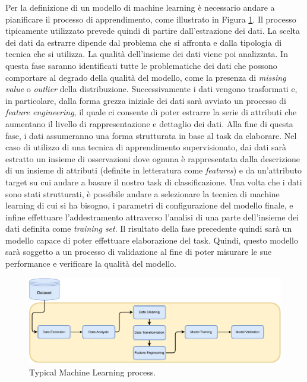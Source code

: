 Per la definizione di un modello di machine learning è necessario andare a pianificare il processo di apprendimento, come illustrato in Figura \ref{fig:ml_process}.
Il processo tipicamente utilizzato prevede quindi di partire dall'estrazione dei dati. La scelta dei dati da estrarre dipende dal problema che si affronta e dalla tipologia di tecnica che si utilizza. 
La qualità dell'insieme dei dati viene poi analizzata. In questa fase saranno identificati tutte le problematiche dei dati che possono comportare al degrado della qualità del modello, come la presenza di \textit{missing value} o \textit{outlier} della distribuzione.
Successivamente i dati vengono trasformati e, in particolare, dalla forma grezza iniziale dei dati sarà avviato un processo di \textit{feature engineering}, il quale ci consente di poter estrarre la serie di attributi che aumentano il livello di rappresentazione e dettaglio dei dati.
Alla fine di questa fase, i dati assumeranno una forma strutturata in base al task da elaborare. Nel caso di utilizzo di una tecnica di apprendimento supervisionato, dai dati sarà estratto un insieme di osservazioni dove ognuna è rappresentata dalla descrizione di un insieme di attributi (definite in letteratura come \textit{features}) e da un'attributo target su cui andare a basare il nostro task di classificazione.
Una volta che i dati sono stati strutturati, è possibile andare a selezionare la tecnica di machine learning di cui si ha bisogno, i parametri di configurazione del modello finale, e infine effettuare l'addestramento attraverso l'analisi di una parte dell'insieme dei dati definita come \textit{training set}.
Il risultato della fase precedente quindi sarà un modello capace di poter effettuare elaborazione del task. Quindi, questo modello sarà soggetto a un processo di validazione al fine di poter misurare le sue performance e verificare la qualità del modello.

\begin{figure}[h]
    \centering
    \includegraphics[width=\textwidth]{Figure/Background/ML_Pipeline-2.pdf}
    \caption{Typical Machine Learning process.}
    \label{fig:ml_process}
\end{figure}

